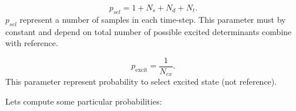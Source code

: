 \documentclass[twoside,english]{uiofysmaster}
\theoremstyle{definition}
\begin{document}
\begin{equation}
p_{sel}= 1+N_{s}+N_{d}+N_{t}.
\end{equation}
$p_{sel}$ represent a number of samples in each time-step. This parameter must by constant and depend on total number of possible excited determinants combine with reference.


\begin{equation}
p_{\text{excit}} = \frac{1}{N_{ex}}.
\end{equation}
This parameter represent probability to select excited state (not reference).





Lets compute some particular probabilities:\\
\end{document}
